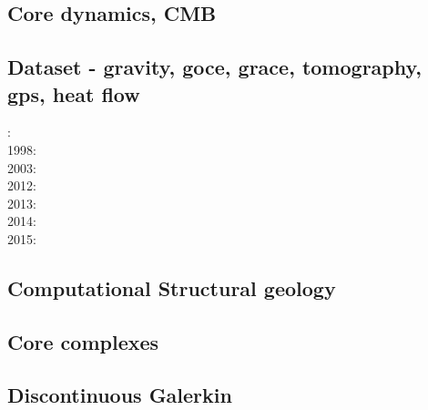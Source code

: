 \subsection*{Core dynamics, CMB}

\cite{hayu96}
\cite{lahb08}

\subsection*{Dataset - gravity, goce, grace, tomography, gps, heat flow}

: \cite{dzan81}\\
1998: \cite{bisp98}\\
2003: \cite{krhh03}\\
2012: \cite{hawj12}\cite{resa12}\cite{hawj12}\\
2013: \cite{ress13}\cite{ebbf13}\cite{davi13}\\
2014: \cite{paml14}\cite{ebbf14}\cite{krbk14}\\
2015: \cite{boem15}

\subsection*{Computational Structural geology}

\cite{acgf00}
\cite{trla00}

\subsection*{Core complexes}

\cite{lehm12}

\subsection*{Discontinuous Galerkin}

\cite{kauf12}\cite{ngpc10}\cite{coks09}\cite{fewk17}\cite{kans08}\cite{geor11}
\cite{cogo09}\cite{cacp02}\cite{cacs05}\cite{coks05}\cite{coks02}\cite{coks00}
\cite{mofh08}\cite{iglo17}\cite{ngpe12}\cite{puth18}\cite{hepb17}\cite{ngpc11}
\cite{conp10}\cite{mofp10}\cite{lelk15} 

